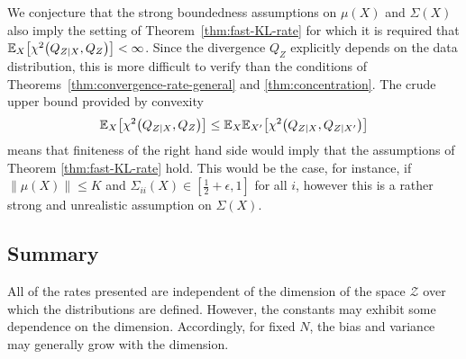 %
%

We conjecture that the strong boundedness assumptions on $\mu(X)$ and $\Sigma(X)$ also imply the setting of Theorem~\ref{thm:fast-KL-rate} for which it is required that $\mathbb{E}_{X}\bigl[\chi^2\bigl(Q_{Z|X}, Q_Z\bigr)\bigr] < \infty$.
Since the divergence $Q_Z$ explicitly depends on the data distribution, this is more difficult to verify than the conditions of Theorems~\ref{thm:convergence-rate-general} and \ref{thm:concentration}.
The crude upper bound provided by convexity
\[
\mathbb{E}_{X}\bigl[\chi^2\bigl(Q_{Z|X}, Q_Z\bigr)\bigr] \leq  \mathbb{E}_{X}\mathbb{E}_{X'}\bigl[\chi^2\bigl(Q_{Z|X}, Q_{Z|X'}\bigr)\bigr]
\]
means that finiteness of the right hand side would imply that the assumptions of Theorem \ref{thm:fast-KL-rate} hold.
This would be the case, for instance, if ${\| \mu(X)\| \leq K}$ and ${\Sigma_{ii}(X) \in [\frac{1}{2}+\epsilon, 1]}$ for all $i$, however this is a rather strong and unrealistic assumption on $\Sigma(X)$.


\subsection{Summary}\label{subsection:discussion-assumptions}
All of the rates presented are independent of the dimension of the space $\mathcal{Z}$ over which the distributions are defined.
However, the constants may exhibit some dependence on the dimension.
Accordingly, for fixed $N$, the bias and variance may generally grow with the dimension.



